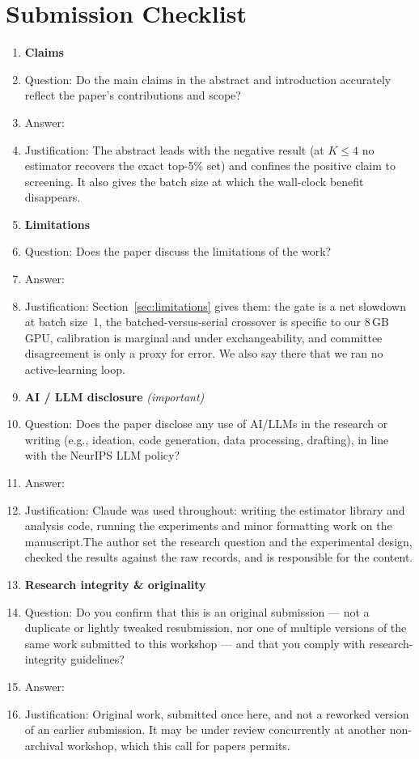 \section*{Submission Checklist}

\begin{enumerate}

\item {\bf Claims}
    \item[] Question: Do the main claims in the abstract and introduction accurately reflect the paper's contributions and scope?
    \item[] Answer: \answerYes{}
    \item[] Justification: The abstract leads with the negative result (at $K\le4$ no estimator recovers the exact top-5\% set) and confines the positive claim to screening. It also gives the batch size at which the wall-clock benefit disappears.

\item {\bf Limitations}
    \item[] Question: Does the paper discuss the limitations of the work?
    \item[] Answer: \answerYes{}
    \item[] Justification: Section~\ref{sec:limitations} gives them: the gate is a net slowdown at batch size~1, the batched-versus-serial crossover is specific to our 8\,GB GPU, calibration is marginal and under exchangeability, and committee disagreement is only a proxy for error. We also say there that we ran no active-learning loop.

\item {\bf AI / LLM disclosure} \emph{(important)}
    \item[] Question: Does the paper disclose any use of AI/LLMs in the research or writing (e.g., ideation, code generation, data processing, drafting), in line with the NeurIPS LLM policy?
    \item[] Answer: \answerYes{}
    \item[] Justification: Claude was used throughout: writing the estimator library and analysis code, running the experiments and minor formatting work on the manuscript.The author set the research question and the experimental design, checked the results against the raw records, and is responsible for the content.

\item {\bf Research integrity \& originality}
    \item[] Question: Do you confirm that this is an original submission --- not a duplicate or lightly tweaked resubmission, nor one of multiple versions of the same work submitted to this workshop --- and that you comply with research-integrity guidelines?
    \item[] Answer: \answerYes{}
    \item[] Justification: Original work, submitted once here, and not a reworked version of an earlier submission. It may be under review concurrently at another non-archival workshop, which this call for papers permits.


\end{enumerate}
